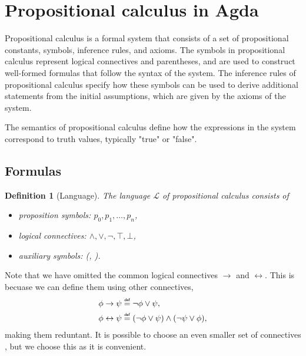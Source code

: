\documentclass[titlepage]{article}
\newcommand\myeq{\mathrel{\overset{\makebox[0pt]{\mbox{\normalfont\tiny\sffamily def}}}{=}}}
\newtheorem{definition}{Definition}[section]
\begin{document}

\section{Propositional calculus in Agda}

Propositional calculus is a formal system that consists of a set of propositional constants, symbols, inference rules, and axioms. The symbols in propositional calculus represent logical connectives and parentheses, and are used to construct well-formed formulas that follow the syntax of the system. The inference rules of propositional calculus specify how these symbols can be used to derive additional statements from the initial assumptions, which are given by the axioms of the system.

The semantics of propositional calculus define how the expressions in the system correspond to truth values, typically "true" or "false". 


\subsection{Formulas}

\begin{definition}[Language]
    The language $\mathcal{L}$ of propositional calculus consists of
    \begin{itemize}
        \item proposition symbols: $p_0,p_1,\hdots,p_n$,
        \item logical connectives: $\wedge,\vee,\neg,\top,\bot$,
        \item auxiliary symbols: (, ).
    \end{itemize}
\end{definition}

Note that we have omitted the common logical connectives $\rightarrow$ and $\leftrightarrow$. This is becuase we can define them using other connectives, 
\begin{align*}
    \phi \rightarrow \psi &\myeq \neg \phi \vee \psi, \\
    \phi \leftrightarrow \psi &\myeq (\neg \phi \vee \psi) \wedge (\neg \psi \vee \phi),
\end{align*}making them reduntant. It is possible to choose an even smaller set of connectives \cite{vanDalen}, but we choose this as it is convenient.
\end{document}
